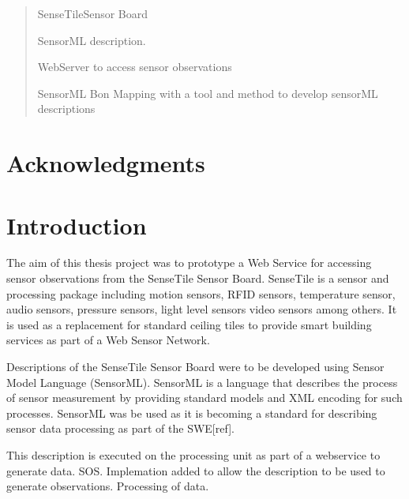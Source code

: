 \documentclass[]{final_report}
\begin{document}
\maketitle
\tableofcontents{}\newpage


\begin{abstract}
SenseTileSensor Board

SensorML description.

WebServer to access sensor observations

SensorML Bon Mapping with a tool and method to develop sensorML descriptions

\end{abstract}




\newpage



\chapter*{Acknowledgments}



\chapter{Introduction}

The aim of this thesis project was to prototype a Web Service for accessing sensor observations from the SenseTile Sensor Board. SenseTile is a sensor and processing package including motion sensors, RFID sensors, temperature sensor, audio sensors, pressure sensors, light level sensors video sensors among others. It is used as a replacement for standard ceiling tiles to provide smart building services as part of a Web Sensor Network.

Descriptions of the SenseTile Sensor Board were to be developed using Sensor Model Language (SensorML)\cite{SensoMLref}. SensorML is a language that describes the process of sensor measurement by providing standard models and XML encoding for such processes. SensorML was be used as it is becoming a standard for describing sensor data processing as part of the SWE[ref].

This description is executed on the processing unit as part of a webservice to generate data.
SOS. Implemation added to allow the description to be used to generate observations. Processing of data.
\end{document}
